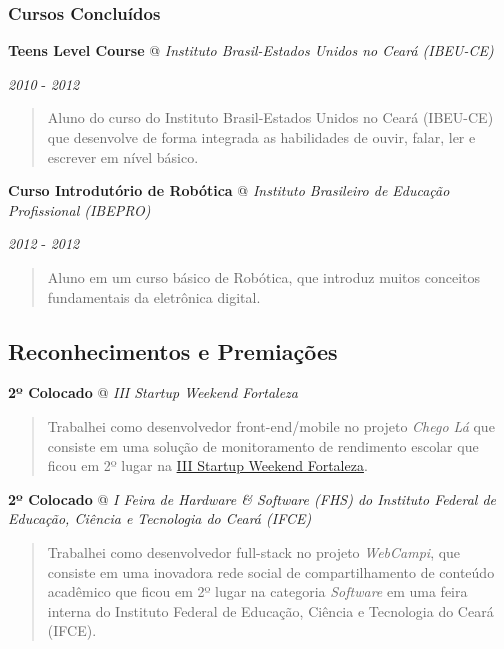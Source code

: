 \documentclass[]{article}
\begin{document}
\subsubsection{Cursos Concluídos}\label{cursos-concluuxeddos}

\textbf{Teens Level Course} @ \emph{Instituto Brasil-Estados Unidos no
Ceará (IBEU-CE)}

\emph{2010} - \emph{2012}

\begin{quote}
Aluno do curso do Instituto Brasil-Estados Unidos no Ceará (IBEU-CE) que
desenvolve de forma integrada as habilidades de ouvir, falar, ler e
escrever em nível básico.
\end{quote}

\textbf{Curso Introdutório de Robótica} @ \emph{Instituto Brasileiro de
Educação Profissional (IBEPRO)}

\emph{2012} - \emph{2012}

\begin{quote}
Aluno em um curso básico de Robótica, que introduz muitos conceitos
fundamentais da eletrônica digital.
\end{quote}

\subsection{Reconhecimentos e
Premiações}\label{reconhecimentos-e-premiauxe7uxf5es}

\textbf{2º Colocado} @ \emph{III Startup Weekend Fortaleza}

\begin{quote}
Trabalhei como desenvolvedor front-end/mobile no projeto \emph{Chego Lá}
que consiste em uma solução de monitoramento de rendimento escolar que
ficou em 2º lugar na
\href{http://www.up.co/communities/brazil/fortaleza/startup-weekend/4487}{III
Startup Weekend Fortaleza}.
\end{quote}

\textbf{2º Colocado} @ \emph{I Feira de Hardware \& Software (FHS) do
Instituto Federal de Educação, Ciência e Tecnologia do Ceará (IFCE)}

\begin{quote}
Trabalhei como desenvolvedor full-stack no projeto \emph{WebCampi}, que
consiste em uma inovadora rede social de compartilhamento de conteúdo
acadêmico que ficou em 2º lugar na categoria \emph{Software} em uma
feira interna do Instituto Federal de Educação, Ciência e Tecnologia do
Ceará (IFCE).
\end{quote}
\end{document}

